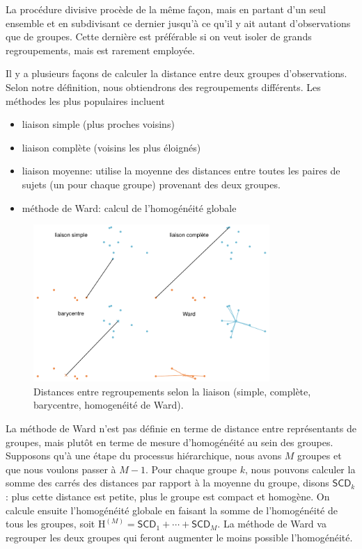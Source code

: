 \documentclass[
  11pt,
  letterpaper,
]{scrbook}
\providecommand{\tightlist}{%
  \setlength{\itemsep}{0pt}\setlength{\parskip}{0pt}}\usepackage{longtable,booktabs,array}
\theoremstyle{definition}
\theoremstyle{remark}
\begin{document}
La procédure divisive procède de la même façon, mais en partant d'un
seul ensemble et en subdivisant ce dernier jusqu'à ce qu'il y ait autant
d'observations que de groupes. Cette dernière est préférable si on veut
isoler de grands regroupements, mais est rarement employée.

Il y a plusieurs façons de calculer la distance entre deux groupes
d'observations. Selon notre définition, nous obtiendrons des
regroupements différents. Les méthodes les plus populaires incluent

\begin{itemize}
\tightlist
\item
  liaison simple (plus proches voisins)
\item
  liaison complète (voisins les plus éloignés)
\item
  liaison moyenne: utilise la moyenne des distances entre toutes les
  paires de sujets (un pour chaque groupe) provenant des deux groupes.
\item
  méthode de Ward: calcul de l'homogénéité globale
\end{itemize}

\begin{figure}[ht!]

{\centering \includegraphics[width=0.8\textwidth,height=\textheight]{regroupements_files/figure-pdf/fig-distances-1.pdf}

}

\caption{\label{fig-distances}Distances entre regroupements selon la
liaison (simple, complète, barycentre, homogenéité de Ward).}

\end{figure}

La méthode de Ward n'est pas définie en terme de distance entre
représentants de groupes, mais plutôt en terme de mesure d'homogénéité
au sein des groupes. Supposons qu'à une étape du processus hiérarchique,
nous avons \(M\) groupes et que nous voulons passer à \(M-1\). Pour
chaque groupe \(k\), nous pouvons calculer la somme des carrés des
distances par rapport à la moyenne du groupe, disons \(\mathsf{SCD}_k\):
plus cette distance est petite, plus le groupe est compact et homogène.
On calcule ensuite l'homogénéité globale en faisant la somme de
l'homogénéité de tous les groupes, soit
\(\mathrm{H}^{(M)} = \mathsf{SCD}_1 + \cdots + \mathsf{SCD}_M\). La
méthode de Ward va regrouper les deux groupes qui feront augmenter le
moins possible l'homogénéité.
\end{document}
